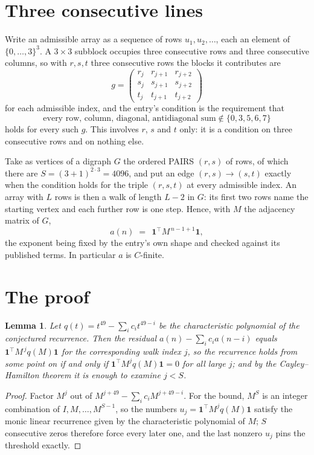 \documentclass[11pt,a4paper]{article}
\theoremstyle{plain}
\newtheorem{lemma}[theorem]{Lemma}
\theoremstyle{definition}
\begin{document}
\section{Three consecutive lines}

Write an admissible array as a sequence of rows $u_1,u_2,\dots$, each an element of
$\{0,\dots,3\}^{3}$. A $3\times3$ subblock occupies three consecutive rows and
three consecutive columns, so with $r,s,t$ three consecutive rows the blocks it
contributes are
\[
g=\begin{pmatrix}r_j&r_{j+1}&r_{j+2}\\ s_j&s_{j+1}&s_{j+2}\\ t_j&t_{j+1}&t_{j+2}\end{pmatrix}
\]
for each admissible index, and the entry's condition is the requirement that
\[
\text{every row, column, diagonal, antidiagonal sum} \notin \{0,3,5,6,7\}
\]
holds for every such $g$. This involves $r$, $s$ and $t$ only: it is a condition on
three consecutive rows and on nothing else.

Take as vertices of a digraph $G$ the ordered PAIRS $(r,s)$ of rows, of which there are
$S=(3+1)^{2\cdot3}=4096$, and put an edge $(r,s)\to(s,t)$ exactly when the condition
holds for the triple $(r,s,t)$ at every admissible index. An array with $L$ rows is then a
walk of length $L-2$ in $G$: its first two rows name the starting vertex and each further
row is one step. Hence, with $M$ the adjacency matrix of $G$,
\[
a(n)\;=\;\,\mathbf{1}^{\!\top}M^{\,n-1+1}\mathbf{1},
\]
the exponent being fixed by the entry's own shape and checked against its published terms.
In particular $a$ is $C$-finite.

\section{The proof}

\begin{lemma}\label{lem:crit}
Let $q(t)=t^{49}-\sum_i c_it^{49-i}$ be the characteristic polynomial of the
conjectured recurrence. Then the residual $a(n)-\sum_ic_ia(n-i)$ equals
$\mathbf{1}^{\!\top}M^{\,j}q(M)\mathbf{1}$ for the corresponding walk index
$j$, so the recurrence holds from some point on if and only if
$\mathbf{1}^{\!\top}M^{j}q(M)\mathbf{1}=0$ for all large $j$; and by the
Cayley--Hamilton theorem it is enough to examine $j<S$.
\end{lemma}

\begin{proof}
Factor $M^{j}$ out of $M^{j+49}-\sum_ic_iM^{j+49-i}$. For the bound, $M^{S}$
is an integer combination of $I,M,\dots,M^{S-1}$, so the numbers
$u_j=\mathbf{1}^{\!\top}M^{j}q(M)\mathbf{1}$ satisfy the monic linear recurrence given by
the characteristic polynomial of $M$; $S$ consecutive zeros therefore force every later one,
and the last nonzero $u_j$ pins the threshold exactly.
\end{proof}
\end{document}
